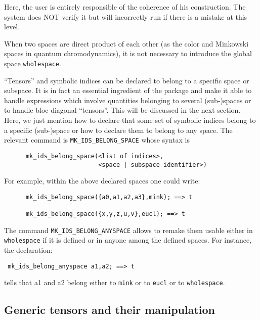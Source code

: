 Here, the user is entirely responsible of the coherence of his construction.
The system does NOT verify it but will incorrectly run if there is a mistake 
at this level. 

When two spaces are direct product of each other (as the color and Minkowski
spaces in quantum chromodynamics), it is not necessary to introduce the 
global space \texttt{wholespace}. 

``Tensors'' and symbolic indices can be declared to belong to a specific space
or subspace. It is in fact an essential ingredient of the package and make it 
able to handle expressions which involve quantities belonging to several 
(sub-)spaces or to handle bloc-diagonal ``tensors''.
This will be discussed in the next section.
Here, we just mention how to declare that some set of symbolic indices belong
to a specific (sub-)space or how to declare them to belong 
to any space.
The relevant command is \texttt{MK\_IDS\_BELONG\_SPACE}
whose syntax is 
\begin{verbatim}
      mk_ids_belong_space(<list of indices>,
                          <space | subspace identifier>)
\end{verbatim}
For example, within the above declared spaces one could write:
\begin{verbatim}
      mk_ids_belong_space({a0,a1,a2,a3},mink); ==> t

      mk_ids_belong_space({x,y,z,u,v},eucl); ==> t 
\end{verbatim}   
The command \texttt{MK\_IDS\_BELONG\_ANYSPACE}
allows to remake them usable  either in \texttt{wholespace}
if it is defined or in anyone among the defined spaces.
For instance, the declaration:
\begin{verbatim}
 mk_ids_belong_anyspace a1,a2; ==> t
\end{verbatim}
tells that a1 and a2 belong either to \texttt{mink} or to \texttt{eucl} or 
to \texttt{wholespace}.

\subsection{Generic tensors and their manipulation}

